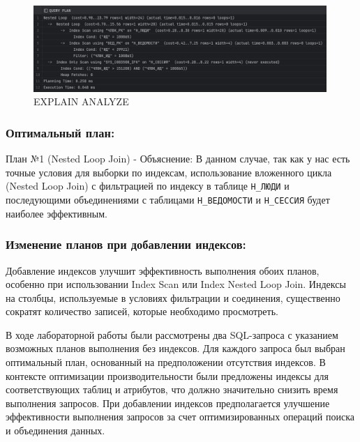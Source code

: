 \documentclass[14pt]{extreport}
\begin{document}
                \begin{figure}[h]
                    \centering
                    \includegraphics[width=0.99\textwidth]{q2.png}
                    \caption{EXPLAIN ANALYZE}
                \end{figure}

                \subsubsection*{Оптимальный план:}
                    План №1 (Nested Loop Join) - Объяснение: В данном случае, так как у нас есть точные условия для выборки по индексам, использование вложенного цикла (Nested Loop Join) с фильтрацией по индексу в таблице \texttt{Н\_ЛЮДИ} и последующими объединениями с таблицами \texttt{Н\_ВЕДОМОСТИ} и \texttt{Н\_СЕССИЯ} будет наиболее эффективным.

                \subsubsection*{Изменение планов при добавлении индексов:}
                    Добавление индексов улучшит эффективность выполнения обоих планов, особенно при использовании Index Scan или Index Nested Loop Join. Индексы на столбцы, используемые в условиях фильтрации и соединения, существенно сократят количество записей, которые необходимо просмотреть.

                \conclusions В ходе лабораторной работы были рассмотрены два SQL-запроса с указанием возможных планов выполнения без индексов. Для каждого запроса был выбран оптимальный план, основанный на предположении отсутствия индексов. В контексте оптимизации производительности были предложены индексы для соответствующих таблиц и атрибутов, что должно значительно снизить время выполнения запросов. При добавлении индексов предполагается улучшение эффективности выполнения запросов за счет оптимизированных операций поиска и объединения данных.
\end{document}
